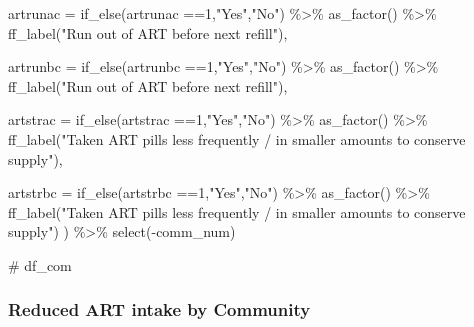 \documentclass[
  letterpaper,
  DIV=11,
  numbers=noendperiod]{scrartcl}
\newenvironment{Shaded}{\begin{snugshade}}{\end{snugshade}}
\newcommand{\AttributeTok}[1]{\textcolor[rgb]{0.40,0.45,0.13}{#1}}
\newcommand{\CommentTok}[1]{\textcolor[rgb]{0.37,0.37,0.37}{#1}}
\newcommand{\DecValTok}[1]{\textcolor[rgb]{0.68,0.00,0.00}{#1}}
\newcommand{\FunctionTok}[1]{\textcolor[rgb]{0.28,0.35,0.67}{#1}}
\newcommand{\NormalTok}[1]{\textcolor[rgb]{0.00,0.23,0.31}{#1}}
\newcommand{\SpecialCharTok}[1]{\textcolor[rgb]{0.37,0.37,0.37}{#1}}
\newcommand{\StringTok}[1]{\textcolor[rgb]{0.13,0.47,0.30}{#1}}
\begin{document}
\begin{Shaded}
\begin{Highlighting}[]
     \AttributeTok{artrunac =} \FunctionTok{if\_else}\NormalTok{(artrunac }\SpecialCharTok{==}\DecValTok{1}\NormalTok{,}\StringTok{"Yes"}\NormalTok{,}\StringTok{"No"}\NormalTok{) }\SpecialCharTok{\%\textgreater{}\%} 
    \FunctionTok{as\_factor}\NormalTok{() }\SpecialCharTok{\%\textgreater{}\%} 
    \FunctionTok{ff\_label}\NormalTok{(}\StringTok{"Run out of ART before next refill"}\NormalTok{),}
 
   \AttributeTok{artrunbc =} \FunctionTok{if\_else}\NormalTok{(artrunbc }\SpecialCharTok{==}\DecValTok{1}\NormalTok{,}\StringTok{"Yes"}\NormalTok{,}\StringTok{"No"}\NormalTok{) }\SpecialCharTok{\%\textgreater{}\%} 
    \FunctionTok{as\_factor}\NormalTok{() }\SpecialCharTok{\%\textgreater{}\%} 
    \FunctionTok{ff\_label}\NormalTok{(}\StringTok{"Run out of ART before next refill"}\NormalTok{),}
  
  \AttributeTok{artstrac =} \FunctionTok{if\_else}\NormalTok{(artstrac }\SpecialCharTok{==}\DecValTok{1}\NormalTok{,}\StringTok{"Yes"}\NormalTok{,}\StringTok{"No"}\NormalTok{) }\SpecialCharTok{\%\textgreater{}\%} 
    \FunctionTok{as\_factor}\NormalTok{() }\SpecialCharTok{\%\textgreater{}\%} 
    \FunctionTok{ff\_label}\NormalTok{(}\StringTok{"Taken ART pills less frequently / in smaller}
\StringTok{amounts to conserve supply"}\NormalTok{),}
  
  \AttributeTok{artstrbc =} \FunctionTok{if\_else}\NormalTok{(artstrbc }\SpecialCharTok{==}\DecValTok{1}\NormalTok{,}\StringTok{"Yes"}\NormalTok{,}\StringTok{"No"}\NormalTok{) }\SpecialCharTok{\%\textgreater{}\%} 
    \FunctionTok{as\_factor}\NormalTok{() }\SpecialCharTok{\%\textgreater{}\%} 
    \FunctionTok{ff\_label}\NormalTok{(}\StringTok{"Taken ART pills less frequently / in smaller}
\StringTok{amounts to conserve supply"}\NormalTok{)}
\NormalTok{  ) }\SpecialCharTok{\%\textgreater{}\%} 
  \FunctionTok{select}\NormalTok{(}\SpecialCharTok{{-}}\NormalTok{comm\_num)}
\end{Highlighting}
\end{Shaded}

\begin{Shaded}
\begin{Highlighting}[]
\CommentTok{\# df\_com}
\end{Highlighting}
\end{Shaded}

\subsubsection{Reduced ART intake by
Community}\label{reduced-art-intake-by-community}
\end{document}
